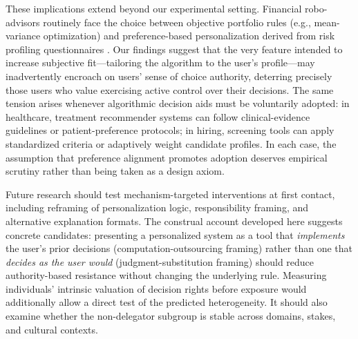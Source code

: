 \documentclass[a4paper, 12pt, fleqn]{article}
\theoremstyle{definition}
\newcommand{\inew}[1]{{\color{blue} #1\color{black}}}
\begin{document}
These implications extend beyond our experimental setting. Financial robo-advisors routinely face the choice between objective portfolio rules (e.g., mean-variance optimization) and preference-based personalization derived from risk profiling questionnaires \citep{Capponi2022,Ruehr2020}. Our findings suggest that the very feature intended to increase subjective fit---tailoring the algorithm to the user's profile---may inadvertently encroach on users' sense of choice authority, deterring precisely those users who value exercising active control over their decisions. The same tension arises whenever algorithmic decision aids must be voluntarily adopted: in healthcare, treatment recommender systems can follow clinical-evidence guidelines or patient-preference protocols; in hiring, screening tools can apply standardized criteria or adaptively weight candidate profiles. In each case, the assumption that preference alignment promotes adoption deserves empirical scrutiny rather than being taken as a design axiom.

Future research should test mechanism-targeted interventions at first contact, including reframing of personalization logic, responsibility framing, and alternative explanation formats. \inew{The construal account developed here suggests concrete candidates: presenting a personalized system as a tool that \emph{implements} the user's prior decisions (computation-outsourcing framing) rather than one that \emph{decides as the user would} (judgment-substitution framing) should reduce authority-based resistance without changing the underlying rule. Measuring individuals' intrinsic valuation of decision rights \citep{Bartling2014,Owens2014} before exposure would additionally allow a direct test of the predicted heterogeneity.} It should also examine whether the non-delegator subgroup is stable across domains, stakes, and cultural contexts.
\end{document}
